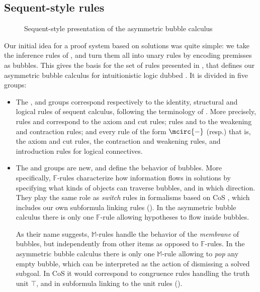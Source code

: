 \subsection{Sequent-style rules}

\begin{figure*}
  
  \caption{Sequent-style presentation of the asymmetric bubble calculus }
\end{figure*}

Our initial idea for a proof system based on solutions was quite simple: we take
the inference rules of , and turn them all into unary rules by encoding
premisses as bubbles. This gives the basis for the set of rules presented in
, that defines our asymmetric bubble
calculus for intuitionistic logic dubbed . It is divided in five groups:
\begin{itemize}
  \item The {\identity}, {\resource} and {\heating} groups correspond
  respectively to the identity, structural and logical rules of sequent
  calculus, following the terminology of . More
  precisely, rules {} and {} correspond
  to the axiom and cut rules; rules {} and {} to the weakening
  and contraction rules; and every rule of the form $\mcirc{-}$ (resp.) that
  is, the axiom and cut rules, the contraction and weakening rules, and
  introduction rules for logical connectives.
  \item The {\flow} and {\membrane} groups are new, and define the behavior of
  bubbles. More specifically, $\mathbb{F}$-rules characterize how information
  flows in solutions by specifying what kinds of objects can traverse bubbles,
  and in which direction. They play the same role as \emph{switch} rules in
  formalisms based on CoS \cite{Guglielmi1999ACO}, which includes our own
  subformula linking rules (). In the asymmetric bubble calculus
  there is only one $\mathbb{F}$-rule {} allowing hypotheses to flow
  inside bubbles.
  
  As their name suggests, $\mathbb{M}$-rules handle the behavior of the
  \emph{membrane} of bubbles, but independently from other items as opposed to
  $\mathbb{F}$-rules. In the asymmetric bubble calculus there is only one
  $\mathbb{M}$-rule {} allowing to \emph{pop} any empty bubble, which
  can be interpreted as the action of dismissing a solved subgoal. In CoS it
  would correspond to congruence rules handling the truth unit $\top$, and in
  subformula linking to the unit rules ().
\end{itemize}

